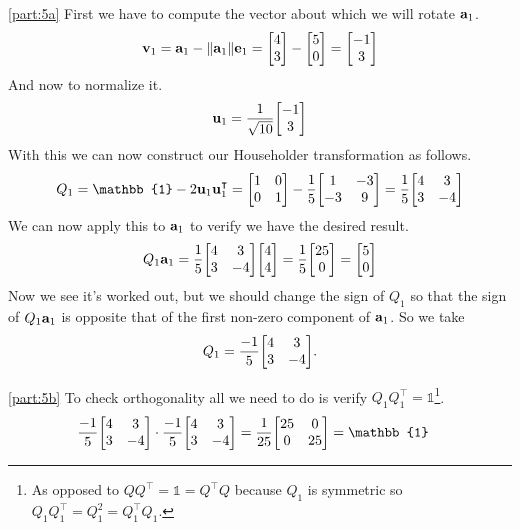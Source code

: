 \documentclass[boxes,pages]{homework}
\newcommand{\tpose}[1]{#1^\intercal}
\begin{document}
\begin{solution}
	\ref{part:5a}
	First we have to compute the vector about which we will rotate $\vb{a}_1$.
	\begin{equation*}
		\vb{v}_1 = \vb{a}_1 - \norm{\vb{a}_1}\vb{e}_1 = \mqty[4 \\ 3] - \mqty[5 \\ 0] = \mqty[-1 \\ 3]
	\end{equation*}
	And now to normalize it.
	\begin{equation*}
		\vb{u}_1  = \frac{1}{\sqrt{10}}\mqty[-1 \\ 3]
	\end{equation*}
	With this we can now construct our Householder transformation as follows.
	\begin{equation*}
		Q_1 = \mathbb{1} - 2\vb{u}_1\tpose{\vb{u}_1} = \mqty[1 & 0 \\ 0 & 1] - \frac{1}{5}\mqty[1 & -3 \\ -3 & 9] = \frac{1}{5}\mqty[4 & 3 \\ 3 & -4]
	\end{equation*}
	We can now apply this to $\vb{a}_1$ to verify we have the desired result.
	\begin{equation*}
		Q_1\vb{a}_1 = \frac{1}{5}\mqty[4 & 3 \\ 3 & -4]\mqty[4 \\ 4] = \frac{1}{5}\mqty[25 \\ 0] = \mqty[5 \\ 0]
	\end{equation*}
	Now we see it's worked out, but we should change the sign of $Q_1$ so that the sign of $Q_1\vb{a}_1$ is opposite that of the first non-zero component of $\vb{a}_1$. So we take
	\begin{equation*}
		Q_1 = \frac{-1}{5}\mqty[4 & 3 \\ 3 & -4].
	\end{equation*}

	\ref{part:5b}
	To check orthogonality all we need to do is verify $Q_1\tpose{Q_1} = \mathbb{1}$\footnote{As opposed to $Q\tpose{Q} = \mathbb{1} = \tpose{Q}Q$ because $Q_1$ is symmetric so $Q_1\tpose{Q_1} = Q_1^2 = \tpose{Q_1}Q_1$.}.
	\begin{align*}
		\frac{-1}{5}\mqty[4 & 3 \\ 3 & -4]\cdot \frac{-1}{5}\mqty[4 & 3 \\ 3 & -4] & = \frac{1}{25}\mqty[\dmat[0]{25,25}] = \mathbb{1}
	\end{align*}


\end{solution}
\end{document}
